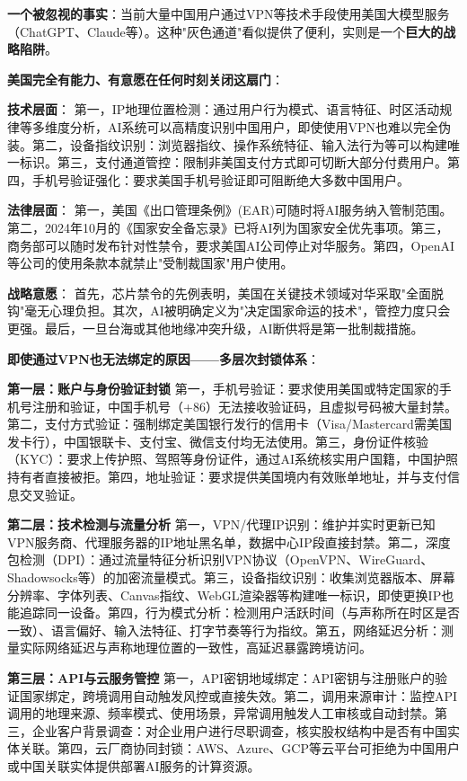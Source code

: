 \textbf{一个被忽视的事实}：当前大量中国用户通过VPN等技术手段使用美国大模型服务（ChatGPT、Claude等）。这种"灰色通道"看似提供了便利，实则是一个\textbf{巨大的战略陷阱}。

\textbf{美国完全有能力、有意愿在任何时刻关闭这扇门}：

\textbf{技术层面}：
第一，IP地理位置检测：通过用户行为模式、语言特征、时区活动规律等多维度分析，AI系统可以高精度识别中国用户，即使使用VPN也难以完全伪装。第二，设备指纹识别：浏览器指纹、操作系统特征、输入法行为等可以构建唯一标识。第三，支付通道管控：限制非美国支付方式即可切断大部分付费用户。第四，手机号验证强化：要求美国手机号验证即可阻断绝大多数中国用户。

\textbf{法律层面}：
第一，美国《出口管理条例》(EAR)可随时将AI服务纳入管制范围。第二，2024年10月的《国家安全备忘录》已将AI列为国家安全优先事项。第三，商务部可以随时发布针对性禁令，要求美国AI公司停止对华服务。第四，OpenAI等公司的使用条款本就禁止"受制裁国家"用户使用。

\textbf{战略意愿}：
首先，芯片禁令的先例表明，美国在关键技术领域对华采取"全面脱钩"毫无心理负担。其次，AI被明确定义为"决定国家命运的技术"，管控力度只会更强。最后，一旦台海或其他地缘冲突升级，AI断供将是第一批制裁措施。

\textbf{即使通过VPN也无法绑定的原因——多层次封锁体系}：

\textbf{第一层：账户与身份验证封锁}
第一，手机号验证：要求使用美国或特定国家的手机号注册和验证，中国手机号（+86）无法接收验证码，且虚拟号码被大量封禁。第二，支付方式验证：强制绑定美国银行发行的信用卡（Visa/Mastercard需美国发卡行），中国银联卡、支付宝、微信支付均无法使用。第三，身份证件核验（KYC）：要求上传护照、驾照等身份证件，通过AI系统核实用户国籍，中国护照持有者直接被拒。第四，地址验证：要求提供美国境内有效账单地址，并与支付信息交叉验证。

\textbf{第二层：技术检测与流量分析}
第一，VPN/代理IP识别：维护并实时更新已知VPN服务商、代理服务器的IP地址黑名单，数据中心IP段直接封禁。第二，深度包检测（DPI）：通过流量特征分析识别VPN协议（OpenVPN、WireGuard、Shadowsocks等）的加密流量模式。第三，设备指纹识别：收集浏览器版本、屏幕分辨率、字体列表、Canvas指纹、WebGL渲染器等构建唯一标识，即使更换IP也能追踪同一设备。第四，行为模式分析：检测用户活跃时间（与声称所在时区是否一致）、语言偏好、输入法特征、打字节奏等行为指纹。第五，网络延迟分析：测量实际网络延迟与声称地理位置的一致性，高延迟暴露跨境访问。

\textbf{第三层：API与云服务管控}
第一，API密钥地域绑定：API密钥与注册账户的验证国家绑定，跨境调用自动触发风控或直接失效。第二，调用来源审计：监控API调用的地理来源、频率模式、使用场景，异常调用触发人工审核或自动封禁。第三，企业客户背景调查：对企业用户进行尽职调查，核实股权结构中是否有中国实体关联。第四，云厂商协同封锁：AWS、Azure、GCP等云平台可拒绝为中国用户或中国关联实体提供部署AI服务的计算资源。

